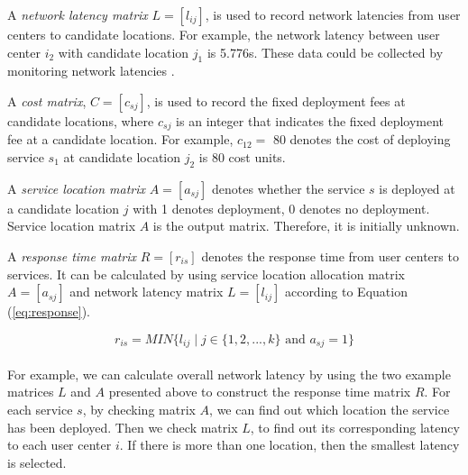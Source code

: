 A \emph{network latency matrix} $L = [l_{ij}]$, is used to record network latencies from user centers to 
candidate locations. For example, the network latency between user center $i_{2}$ with candidate location $j_{1}$ 
is 5.776s. These data could be collected by monitoring network latencies \cite{6076756} \cite{5552800}.

A \emph{cost matrix}, $C = [c_{sj}]$, is used to record the fixed deployment fees at candidate locations, 
where $c_{sj}$ is an integer that indicates the fixed deployment fee at a candidate location. 
For example, $c_{12} = $ 80 denotes the cost of deploying service $s_{1}$ at candidate location $j_{2}$ is 80 cost units.
% 

A \emph{service location matrix} $A = [a_{sj}]$ denotes whether the service $s$ is deployed at a candidate location $j$ with 1 denotes deployment, 0 denotes no deployment. 
Service location matrix $A$ is the output matrix. Therefore, it is initially unknown.


A \emph{response time matrix}  $R = [r_{is}]$ denotes the response time from user centers to services. It can be calculated
by using service location allocation matrix $A = [a_{sj}]$ and network latency matrix $L = [l_{ij}]$ according to Equation (\ref{eq:response}).

{\centering
	\begin{equation}
	\label{eq:response}
		r_{is} = MIN\{l_{ij} \mid j \in \{1, 2, ..., k\} \text{ and } a_{sj} = 1\}
	\end{equation}
\\}
For example, we can calculate overall network latency by using the two example matrices $L$ and $A$ presented above to construct the response time matrix $R$. 
For each service $s$, by checking matrix $A$, we can find out which location the service has been deployed.
Then we check matrix $L$, to find out its corresponding latency to each user center $i$. If there is
more than one location, then the smallest latency is selected. 

% 

